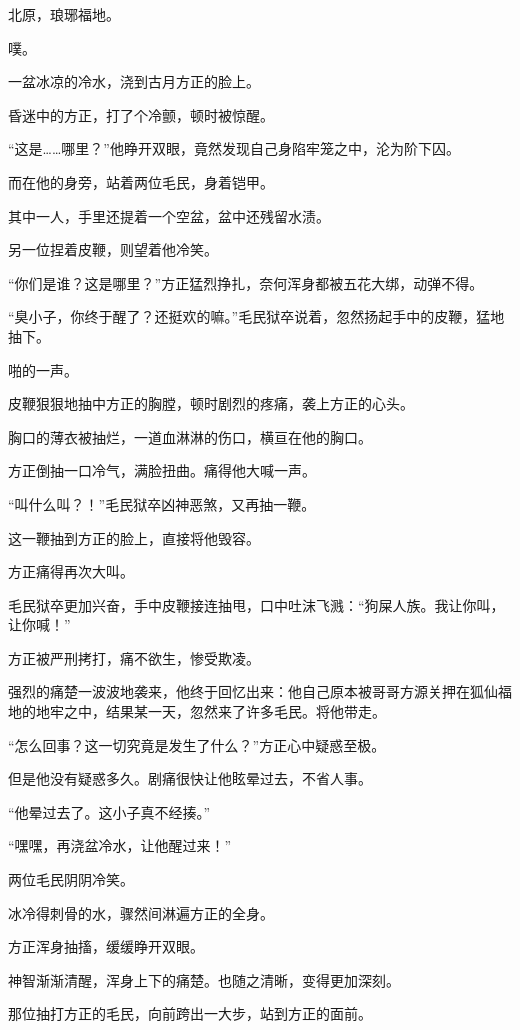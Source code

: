 \begin{this_body}
北原，琅琊福地。

噗。

一盆冰凉的冷水，浇到古月方正的脸上。

昏迷中的方正，打了个冷颤，顿时被惊醒。

“这是……哪里？”他睁开双眼，竟然发现自己身陷牢笼之中，沦为阶下囚。

而在他的身旁，站着两位毛民，身着铠甲。

其中一人，手里还提着一个空盆，盆中还残留水渍。

另一位捏着皮鞭，则望着他冷笑。

“你们是谁？这是哪里？”方正猛烈挣扎，奈何浑身都被五花大绑，动弹不得。

“臭小子，你终于醒了？还挺欢的嘛。”毛民狱卒说着，忽然扬起手中的皮鞭，猛地抽下。

啪的一声。

皮鞭狠狠地抽中方正的胸膛，顿时剧烈的疼痛，袭上方正的心头。

胸口的薄衣被抽烂，一道血淋淋的伤口，横亘在他的胸口。

方正倒抽一口冷气，满脸扭曲。痛得他大喊一声。

“叫什么叫？！”毛民狱卒凶神恶煞，又再抽一鞭。

这一鞭抽到方正的脸上，直接将他毁容。

方正痛得再次大叫。

毛民狱卒更加兴奋，手中皮鞭接连抽甩，口中吐沫飞溅：“狗屎人族。我让你叫，让你喊！”

方正被严刑拷打，痛不欲生，惨受欺凌。

强烈的痛楚一波波地袭来，他终于回忆出来：他自己原本被哥哥方源关押在狐仙福地的地牢之中，结果某一天，忽然来了许多毛民。将他带走。

“怎么回事？这一切究竟是发生了什么？”方正心中疑惑至极。

但是他没有疑惑多久。剧痛很快让他眩晕过去，不省人事。

“他晕过去了。这小子真不经揍。”

“嘿嘿，再浇盆冷水，让他醒过来！”

两位毛民阴阴冷笑。

冰冷得刺骨的水，骤然间淋遍方正的全身。

方正浑身抽搐，缓缓睁开双眼。

神智渐渐清醒，浑身上下的痛楚。也随之清晰，变得更加深刻。

那位抽打方正的毛民，向前跨出一大步，站到方正的面前。


\end{this_body}
